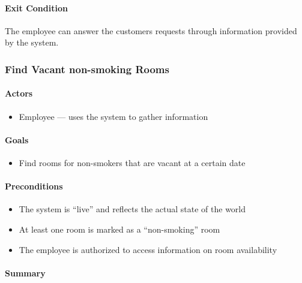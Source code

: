\paragraph{Exit Condition}\label{exit-condition}

The employee can answer the customers requests through information
provided by the system.

\subsubsection{Find Vacant non-smoking
Rooms}\label{find-vacant-non-smoking-rooms}

\paragraph{Actors}\label{actors-1}

\begin{itemize}
\tightlist
\item
  Employee --- uses the system to gather information
\end{itemize}

\paragraph{Goals}\label{goals-1}

\begin{itemize}
\tightlist
\item
  Find rooms for non-smokers that are vacant at a certain date
\end{itemize}

\paragraph{Preconditions}\label{preconditions-1}

\begin{itemize}
\tightlist
\item
  The system is ``live'' and reflects the actual state of the world
\item
  At least one room is marked as a ``non-smoking'' room
\item
  The employee is authorized to access information on room availability
\end{itemize}

\paragraph{Summary}\label{summary-1}

